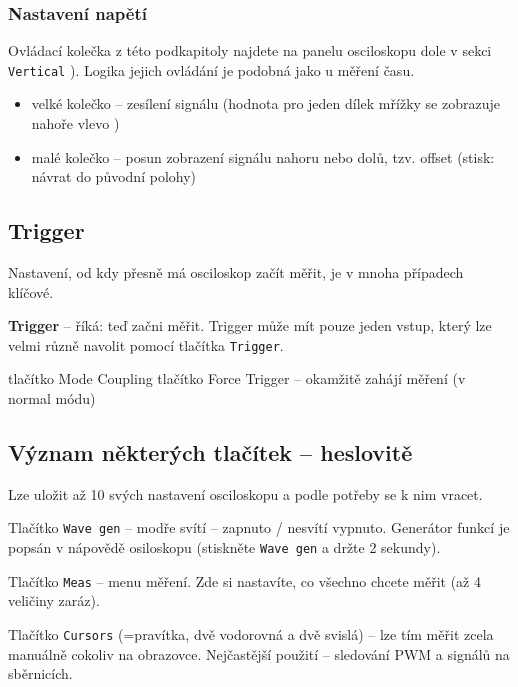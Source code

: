 \subsubsection{Nastavení napětí}

Ovládací kolečka z této podkapitoly najdete na panelu osciloskopu  dole v sekci {\tt Vertical} ).
Logika jejich ovládání je podobná jako u měření času. 
\begin{itemize}
	\item velké kolečko -- zesílení signálu (hodnota pro jeden dílek mřížky se zobrazuje nahoře vlevo )
	\item malé kolečko -- posun zobrazení signálu nahoru nebo dolů, tzv. offset  (stisk: návrat do původní polohy) 
	 
\end{itemize}

\subsection{Trigger} %

Nastavení, od kdy přesně má osciloskop začít měřit, je v mnoha případech klíčové. 

\textbf{Trigger} -- říká: teď začni měřit. Trigger může mít pouze jeden vstup, který lze velmi různě navolit pomocí tlačítka \texttt{Trigger}.

tlačítko Mode Coupling %
tlačítko Force Trigger -- okamžitě zahájí měření (v normal módu) 


\subsection{Význam některých tlačítek -- heslovitě}



Lze uložit až 10 svých nastavení osciloskopu a podle potřeby se k nim vracet.  %

 Tlačítko  \texttt{Wave  gen} -- modře svítí -- zapnuto / nesvítí vypnuto. 
 Generátor funkcí je popsán v nápovědě osiloskopu (stiskněte \texttt{Wave  gen} a držte 2 sekundy). 

 Tlačítko \texttt{Meas}  -- menu měření.
Zde si nastavíte, co všechno chcete měřit  (až 4 veličiny zaráz).

Tlačítko \texttt{Cursors}   (=pravítka, dvě vodorovná a dvě svislá)  -- lze tím měřit zcela manuálně cokoliv na obrazovce.
Nejčastější použití -- sledování PWM a signálů na sběrnicích. 

